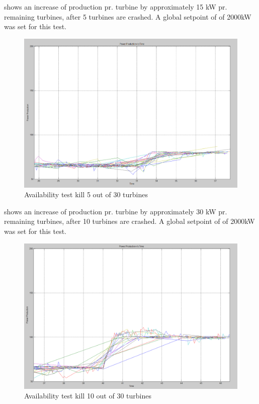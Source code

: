  shows an increase of production pr. turbine by approximately 15 kW pr. remaining turbines, after 5 turbines are crashed. A global setpoint of of 2000kW was set for this test.

\begin{figure} [!h]
	\centering
	\includegraphics[width=\resultsFigureWidthScale\textwidth]{figures/Results/availabilitytest30-25_setpoint_2000.PNG}
	\caption{Availability test kill 5 out of 30 turbines}
	\label{fig:exp:availability_kill5}
\end{figure}

\FloatBarrier
{} shows an increase of production pr. turbine by approximately 30 kW pr. remaining turbines, after 10 turbines are crashed. A global setpoint of of 2000kW was set for this test.

\begin{figure}[!h]
	\centering
	\includegraphics[width=\resultsFigureWidthScale\textwidth]{figures/Results/availabilitytest30-20_setpoint_2000.PNG}
	\caption{Availability test kill 10 out of 30 turbines}
	\label{fig:exp:availability_kill10}
\end{figure}

